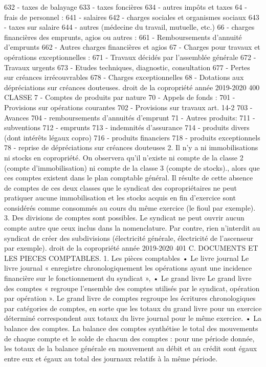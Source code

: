 632 - taxes de balayage
633 - taxes foncières
634 - autres impôts et taxes
64 - frais de personnel :
641 - salaires
642 - charges sociales et organismes sociaux
643 - taxes sur salaire
644 - autres (médecine du travail, mutuelle, etc.)
66 - charges financières des emprunts, agios ou autres :
661 - Remboursements d'annuité d'emprunts
662 - Autres charges financières et agios
67 - Charges pour travaux et opérations exceptionnelles :
671 - Travaux décidés par l'assemblée générale
672 - Travaux urgents
673 - Etudes techniques, diagnostic, consultation
677 - Pertes sur créances irrécouvrables
678 - Charges exceptionnelles
68 - Dotations aux dépréciations sur créances douteuses.
droit de la copropriété année 2019-2020
400
CLASSE 7 - Comptes de produits par nature
70 - Appels de fonds :
701 - Provisions sur opérations courantes
702 - Provisions sur travaux art. 14-2 703 - Avances
704 - remboursements d'annuités d'emprunt
71 - Autres produits:
711 - subventions
712 - emprunts
713 - indemnités d'assurance
714 - produits divers (dont intérêts légaux copro) 716 - produits financiers
718 - produits exceptionnels
78 - reprise de dépréciations sur créances douteuses
2. Il n'y a ni immobilisations ni stocks en copropriété.
On observera qu'il n'existe ni compte de la classe 2 (compte d'immobilisation) ni compte de la classe 3 (compte de stocks)., alors que ces comptes existent dans le plan comptable général. Il résulte de cette absence de comptes de ces deux classes que le syndicat des copropriétaires ne peut pratiquer aucune immobilisation et les stocks acquis en fin d'exercice sont considérés comme consommés au cours du même exercice (le fioul par exemple).
3. Des divisions de comptes sont possibles.
Le syndicat ne peut ouvrir aucun compte autre que ceux inclus dans la nomenclature. Par contre, rien n'interdit au syndicat de créer des subdivisions (électricité générale, électricité de l'ascenseur par exemple).
droit de la copropriété année 2019-2020
401
C. DOCUMENTS ET LES PIECES COMPTABLES.
1. Les pièces comptables
• Le livre journal
Le livre journal « enregistre chronologiquement les opérations ayant une incidence financière sur le fonctionnement du syndicat »,
• Le grand livre
Le grand livre des comptes « regroupe l'ensemble des comptes utilisés par le syndicat, opération par opération ».
Le grand livre de comptes regroupe les écritures chronologiques par catégories de comptes, en sorte que les totaux du grand livre pour un exercice déterminé correspondent aux totaux du livre journal pour le même exercice.
• La balance des comptes.
La balance des comptes synthétise le total des mouvements de chaque compte et le solde de chacun des comptes : pour une période donnée, les totaux de la balance générale en mouvement au débit et au crédit sont égaux entre eux et égaux au total des journaux relatifs à la même période.
